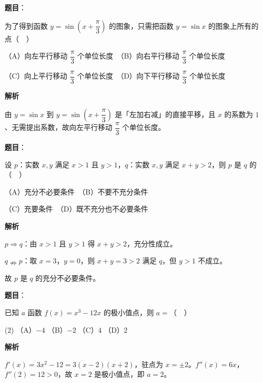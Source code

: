\begin{answer}

\textbf{题目}：

为了得到函数 \(y=\sin\left(x+\dfrac{\pi}{3}\right)\) 的图象，只需把函数 \(y=\sin x\) 的图象上所有的点（　）

（A）向左平行移动 \(\dfrac{\pi}{3}\) 个单位长度　（B）向右平行移动 \(\dfrac{\pi}{3}\) 个单位长度

（C）向上平行移动 \(\dfrac{\pi}{3}\) 个单位长度　（D）向下平行移动 \(\dfrac{\pi}{3}\) 个单位长度

\textbf{解析}

由 \(y=\sin x\) 到 \(y=\sin\left(x+\dfrac{\pi}{3}\right)\) 是「左加右减」的直接平移，且 \(x\) 的系数为 \(1\)、无需提出系数，故向左平行移动 \(\dfrac{\pi}{3}\) 个单位长度。


\end{answer}
\begin{answer}

\textbf{题目}：

设 \(p\)：实数 \(x,y\) 满足 \(x>1\) 且 \(y>1\)，\(q\)：实数 \(x,y\) 满足 \(x+y>2\)，则 \(p\) 是 \(q\) 的（　）

（A）充分不必要条件　（B）不要不充分条件

（C）充要条件　（D）既不充分也不必要条件

\textbf{解析}

\(p\Rightarrow q\)：由 \(x>1\) 且 \(y>1\) 得 \(x+y>2\)，充分性成立。

\(q\nRightarrow p\)：取 \(x=3\)，\(y=0\)，则 \(x+y=3>2\) 满足 \(q\)，但 \(y>1\) 不成立。

故 \(p\) 是 \(q\) 的充分不必要条件。


\end{answer}
\begin{answer}

\textbf{题目}：

已知 \(a\) 函数 \(f(x)=x^{3}-12x\) 的极小值点，则 \(a=\)（　）

\begin{gkopts}(2)
\task （A）\(-4\)
\task （B）\(-2\)
\task （C）\(4\)
\task （D）\(2\)
\end{gkopts}

\textbf{解析}

\(f'(x)=3x^{2}-12=3(x-2)(x+2)\)，驻点为 \(x=\pm2\)。\(f''(x)=6x\)，\(f''(2)=12>0\)，故 \(x=2\) 是极小值点，即 \(a=2\)。


\end{answer}
